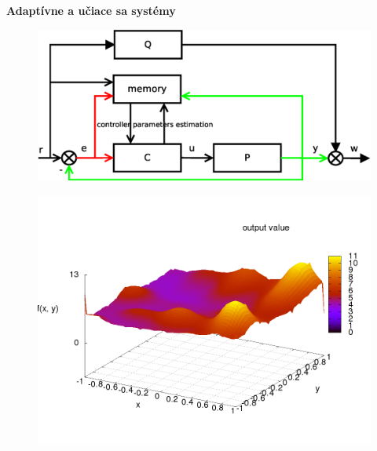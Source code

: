 \documentclass[xcolor=dvipsnames]{beamer}
\begin{document}
\begin{frame}{\bf Adaptívne a učiace sa systémy}
\begin{minipage}{.5\textwidth}
  \begin{figure}[!htb]
  \centering
  \includegraphics[scale=.22]{../diagrams/learning_system.eps}
  \label{fig:learning_system}
  \end{figure}

  \begin{figure}[!htb]
  \centering
  \includegraphics[scale=.2]{../pictures/function_f0.png}
  \end{figure}

\end{minipage}
\end{frame}
\end{document}
